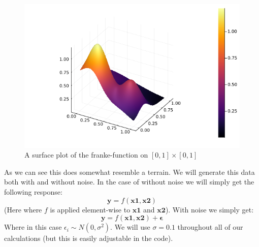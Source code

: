 \documentclass{article}
\begin{document}
\begin{figure}
    \includegraphics[scale=0.5]{frankefunction}
    \caption{A surface plot of the franke-function on $\left[ 0, 1 \right] \times \left[ 0, 1 \right]$}
    \label{franke-function-plot}
\end{figure}

As we can see this does somewhat resemble a terrain. We will generate this data
both with and without noise.  In the case of without noise we will simply get
the following response:
$$\mathbf{y} = f(\mathbf{x1}, \mathbf{x2})$$
(Here where $f$ is applied element-wise to $\mathbf{x1}$ and $\mathbf{x2}$).
With noise we simply get:
$$\mathbf{y} = f(\mathbf{x1}, \mathbf{x2}) + \mathbf{\epsilon}$$
Where in this case $\epsilon_i \sim N(0, \sigma^2)$. We will use $\sigma = 0.1$
throughout all of our calculations (but this is easily adjustable in the code).
\end{document}
